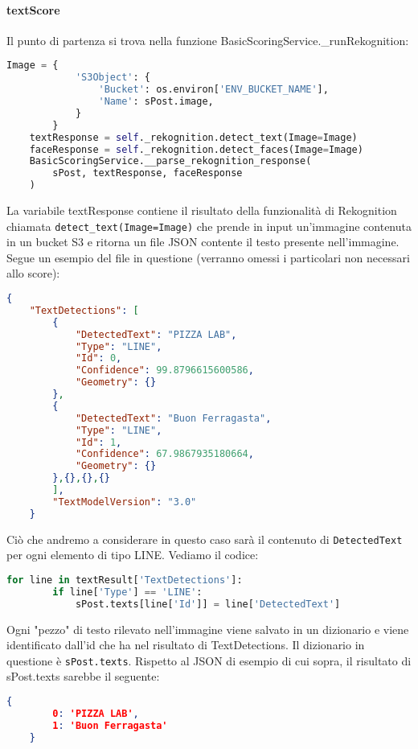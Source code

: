 \paragraph{textScore}
Il punto di partenza si trova nella funzione BasicScoringService.\_runRekognition:
\begin{lstlisting}[language=Python]
    Image = {
            'S3Object': {
                'Bucket': os.environ['ENV_BUCKET_NAME'],
                'Name': sPost.image,
            }
        }
    textResponse = self._rekognition.detect_text(Image=Image)
    faceResponse = self._rekognition.detect_faces(Image=Image)
    BasicScoringService.__parse_rekognition_response(
        sPost, textResponse, faceResponse
    )
\end{lstlisting}
La variabile textResponse contiene il risultato della funzionalità
di Rekognition chiamata \verb+detect_text(Image=Image)+ che prende in input un'immagine contenuta
in un bucket S3 e ritorna un file JSON contente il testo presente nell'immagine.
Segue un esempio del file in questione (verranno omessi i particolari non necessari allo score):
\begin{lstlisting}[language=JSON]
    {
    "TextDetections": [
        {
            "DetectedText": "PIZZA LAB",
            "Type": "LINE",
            "Id": 0,
            "Confidence": 99.8796615600586,
            "Geometry": {}
        },
        {
            "DetectedText": "Buon Ferragasta",
            "Type": "LINE",
            "Id": 1,
            "Confidence": 67.9867935180664,
            "Geometry": {}
        },{},{},{}
        ],
        "TextModelVersion": "3.0"
    }        
\end{lstlisting}
Ciò che andremo a considerare in questo caso sarà il contenuto di \verb+DetectedText+
per ogni elemento di tipo LINE. 
Vediamo il codice: 
\begin{lstlisting}[language=Python]
    for line in textResult['TextDetections']:
        if line['Type'] == 'LINE':
            sPost.texts[line['Id']] = line['DetectedText']
\end{lstlisting}
Ogni "pezzo" di testo rilevato nell'immagine viene salvato in un dizionario e viene
identificato dall'id che ha nel risultato di TextDetections. Il dizionario in
questione è \verb+sPost.texts+.
Rispetto al JSON di esempio di cui sopra, il risultato di sPost.texts sarebbe il seguente:
\begin{lstlisting}[language=JSON]
    {
        0: 'PIZZA LAB', 
        1: 'Buon Ferragasta'
    }
\end{lstlisting}
